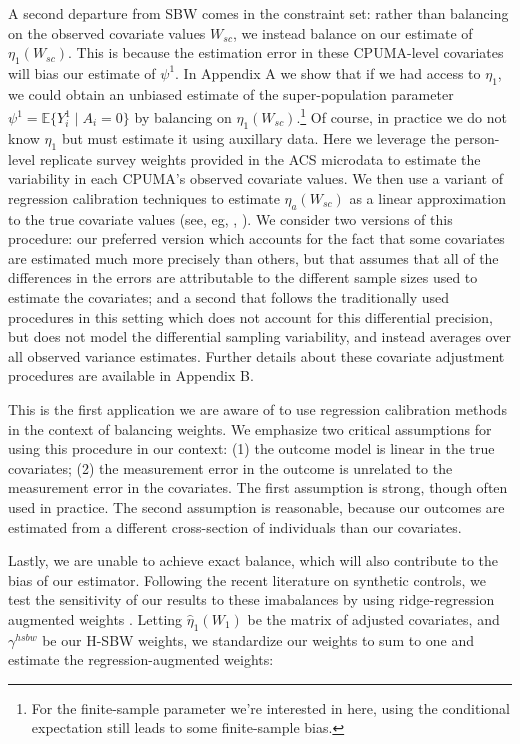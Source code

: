 \documentclass[12pt]{article}
\begin{document}
A second departure from SBW comes in the constraint set: rather than balancing on the observed covariate values $W_{sc}$, we instead balance on our estimate of $\eta_1(W_{sc})$. This is because the estimation error in these CPUMA-level covariates will bias our estimate of $\psi^1$. In Appendix A we show that if we had access to $\eta_1$, we could obtain an unbiased estimate of the super-population parameter $\psi^1 = \mathbb{E}\{Y_i^1 \mid A_i = 0\}$ by balancing on $\eta_1(W_{sc})$.\footnote{For the finite-sample parameter we're interested in here, using the conditional expectation still leads to some finite-sample bias.} Of course, in practice we do not know $\eta_1$ but must estimate it using auxillary data. Here we leverage the person-level replicate survey weights provided in the ACS microdata to estimate the variability in each CPUMA's observed covariate values. We then use a variant of regression calibration techniques to estimate $\eta_a(W_{sc})$ as a linear approximation to the true covariate values (see, eg, \cite{gleser1992importance}, \cite{carroll2006measurement}). We consider two versions of this procedure: our preferred version which accounts for the fact that some covariates are estimated much more precisely than others, but that assumes that all of the differences in the errors are attributable to the different sample sizes used to estimate the covariates; and a second that follows the traditionally used procedures in this setting which does not account for this differential precision, but does not model the differential sampling variability, and instead averages over all observed variance estimates. Further details about these covariate adjustment procedures are available in Appendix B.

This is the first application we are aware of to use regression calibration methods in the context of balancing weights. We emphasize two critical assumptions for using this procedure in our context: (1) the outcome model is linear in the true covariates; (2) the measurement error in the outcome is unrelated to the measurement error in the covariates. The first assumption is strong, though often used in practice. The second assumption is reasonable, because our outcomes are estimated from a different cross-section of individuals than our covariates. 

Lastly, we are unable to achieve exact balance, which will also contribute to the bias of our estimator. Following the recent literature on synthetic controls, we test the sensitivity of our results to these imabalances by using ridge-regression augmented weights \cite{ben2018augmented}. Letting $\hat{\eta}_1(W_1)$ be the matrix of adjusted covariates, and $\gamma^{hsbw}$ be our H-SBW weights, we standardize our weights to sum to one and estimate the regression-augmented weights:
\end{document}
